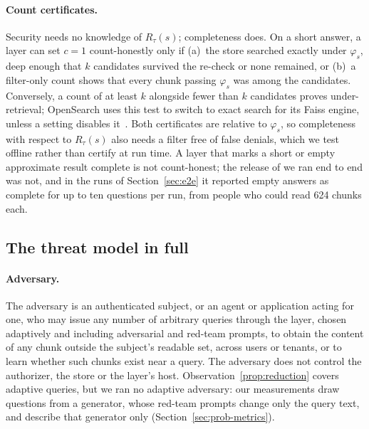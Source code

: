 \paragraph{Count certificates.}
Security needs no knowledge of $R_\tau(s)$; completeness does. On a short answer, a layer can set $c = 1$ count-honestly
only if (a)~the store searched exactly under $\varphi_s$, deep enough that $k$ candidates survived the
re-check or none remained, or (b)~a filter-only count shows that every chunk passing $\varphi_s$ was
among the candidates. Conversely, a count of at least $k$ alongside fewer than $k$ candidates proves
under-retrieval; OpenSearch uses this test to switch to exact search for its Faiss engine, unless a setting disables it~\cite{opensearch2026efficient}.
Both certificates are relative to $\varphi_s$, so completeness with respect to $R_\tau(s)$ also needs
a filter free of false denials, which we test offline rather than certify at run time. A layer that
marks a short or empty approximate result complete is not count-honest; the release of \sys{} we ran
end to end was not, and in the runs of Section~\ref{sec:e2e} it reported empty answers as complete for
up to ten questions per run, from people who could read 624 chunks each.

\subsection{The threat model in full}\label{app:threat}

\paragraph{Adversary.}
The adversary is an authenticated subject, or an agent or application acting for one, who may issue
any number of arbitrary queries through the layer, chosen adaptively and including adversarial and
red-team prompts, to obtain the content of any chunk outside the subject's readable set, across
users or tenants, or to learn whether such chunks exist near a query. The adversary does not control
the authorizer, the store or the layer's host. Observation~\ref{prop:reduction} covers adaptive
queries, but we ran no adaptive adversary: our measurements draw questions from a generator, whose red-team prompts change only the query text, and describe that
generator only (Section~\ref{sec:prob-metrics}).


